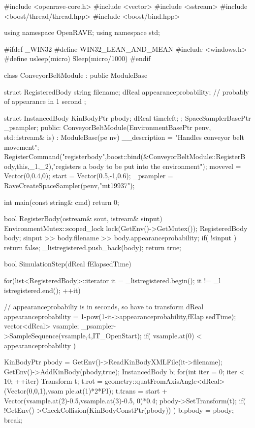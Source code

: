 \begin{DoxyCodeInclude}

#include <openrave-core.h>
#include <vector>
#include <sstream>
#include <boost/thread/thread.hpp>
#include <boost/bind.hpp>

using namespace OpenRAVE;
using namespace std;

#ifdef _WIN32
#define WIN32_LEAN_AND_MEAN
#include <windows.h>
#define usleep(micro) Sleep(micro/1000)
#endif

class ConveyorBeltModule : public ModuleBase
{
    struct RegisteredBody
    {
        string filename;
        dReal appearanceprobability;     // probably of appearance in 1 second
    };

    struct InstancedBody
    {
        KinBodyPtr pbody;
        dReal timeleft;
    };
    SpaceSamplerBasePtr _psampler;
public:
    ConveyorBeltModule(EnvironmentBasePtr penv, std::istream& is) : ModuleBase(pe
      nv)
    {
        __description = "Handles conveyor belt movement";
        RegisterCommand("registerbody",boost::bind(&ConveyorBeltModule::RegisterB
      ody,this,_1,_2),"registers a body to be put into the environment");
        movevel = Vector(0,0.4,0);
        start = Vector(0.5,-1,0.6);
        _psampler = RaveCreateSpaceSampler(penv,"mt19937");
    }

    int main(const string& cmd)
    {
        return 0;
    }

    bool RegisterBody(ostream& sout, istream& sinput)
    {
        EnvironmentMutex::scoped_lock lock(GetEnv()->GetMutex());
        RegisteredBody body;
        sinput >> body.filename >> body.appearanceprobability;
        if( !sinput ) {
            return false;
        }
        _listregistered.push_back(body);
        return true;
    }

    bool SimulationStep(dReal fElapsedTime)
    {
        for(list<RegisteredBody>::iterator it = _listregistered.begin(); it != _l
      istregistered.end(); ++it) {
            // appearanceprobabiliy is in seconds, so have to transform
            dReal appearanceprobability = 1-pow(1-it->appearanceprobability,fElap
      sedTime);
            vector<dReal> vsample;
            _psampler->SampleSequence(vsample,4,IT_OpenStart);
            if( vsample.at(0) < appearanceprobability ) {
                KinBodyPtr pbody = GetEnv()->ReadKinBodyXMLFile(it->filename);
                GetEnv()->AddKinBody(pbody,true);
                InstancedBody b;
                for(int iter = 0; iter < 10; ++iter) {
                    Transform t;
                    t.rot = geometry::quatFromAxisAngle<dReal>(Vector(0,0,1),vsam
      ple.at(1)*2*PI);
                    t.trans = start + Vector(vsample.at(2)-0.5,vsample.at(3)-0.5,
      0)*0.4;
                    pbody->SetTransform(t);
                    if( !GetEnv()->CheckCollision(KinBodyConstPtr(pbody)) ) {
                        b.pbody = pbody;
                        break;
                    }
                }

}}}}
\end{DoxyCodeInclude}
